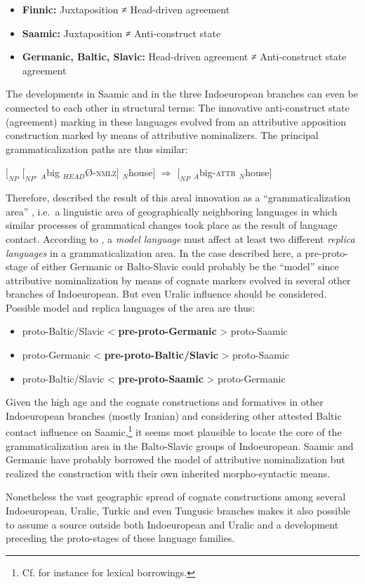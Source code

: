 \begin{itemize}
\item	\textbf{Finnic:}
\subitem Juxtaposition ≠ Head-driven agreement
\item	\textbf{Saamic:}
\subitem Juxtaposition ≠ Anti-construct state
\item	\textbf{Germanic, Baltic, Slavic:}
\subitem Head-driven agreement ≠ Anti-construct state agreement
\end{itemize}
The developments in Saamic and in the three Indoeuropean branches can even be connected to each other in structural terms: The innovative anti-construct state (agreement) marking in these languages evolved from an attributive apposition construction marked by means of attributive nominalizers. The principal grammaticalization paths are thus similar:
\begin{exe}
\ex $[_{NP}$ $[_{NP'}$ $_{A}$big $_{HEAD}$Ø-\textsc{nmlz}$]$ $_{N}$house$]$ $\Rightarrow$ $[_{NP}$ $_{A}$big-\textsc{attr} $_{N}$house$]$
\end{exe}
Therefore, \citet[271]{riesler2006a} described the result of this areal innovation as a “grammaticalization area” \citep{heine-etal2005}, i.e.~a linguistic area of geographically neighboring languages in which similar processes of grammatical changes took place as the result of language contact. According to \citet{heine-etal2005}, a {\it model language} must affect at least two different {\it replica languages} in a grammaticalization area. In the case described here, a pre-proto-stage of either Germanic or Balto-Slavic could probably be the “model” since attributive nominalization by means of cognate markers evolved in several other branches of Indoeuropean. But even Uralic influence should be considered. Possible model and replica languages of the area are thus:
\begin{itemize}
\item	\begin{center}proto-Baltic/Slavic < \textbf{pre-proto-Germanic} > proto-Saamic\end{center}
\item	\begin{center}proto-Germanic < \textbf{pre-proto-Baltic/Slavic} > proto-Saamic\end{center}
\item \begin{center}proto-Baltic/Slavic < \textbf{pre-proto-Saamic} > proto-Germanic\end{center}
\end{itemize}
Given the high age and the cognate constructions and formatives in other Indoeuropean branches (mostly Iranian) and considering other attested Baltic contact influence on Saamic,\footnote{Cf. for instance \citealt{riesler2009} for lexical borrowings.} it seems most plausible to locate the core of the grammaticalization area in the Balto-Slavic groups of Indoeuropean. Saamic and Germanic have probably borrowed the model of attributive nominalization but realized the construction with their own inherited morpho-syntactic means.

Nonetheless the vast geographic spread of cognate constructions among several Indoeuropean, Uralic, Turkic and even Tungusic branches makes it also possible to assume a source outside both Indoeuropean and Uralic and a development preceding the proto-stages of these language families.
